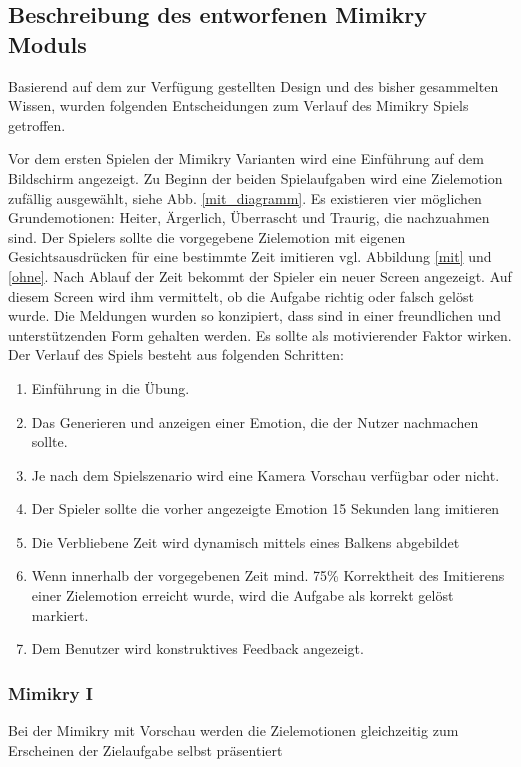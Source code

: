\subsection{Beschreibung des entworfenen Mimikry Moduls}
Basierend auf dem zur Verfügung gestellten Design und des bisher gesammelten Wissen, wurden folgenden Entscheidungen zum Verlauf des Mimikry Spiels getroffen.

Vor dem ersten Spielen der Mimikry Varianten wird eine Einführung auf dem Bildschirm angezeigt. Zu Beginn der beiden Spielaufgaben wird eine Zielemotion zufällig ausgewählt, siehe Abb. \ref{mit_diagramm}. Es existieren vier möglichen Grundemotionen: Heiter, Ärgerlich, Überrascht und Traurig, die nachzuahmen sind. Der Spielers sollte die vorgegebene Zielemotion mit eigenen Gesichtsausdrücken für eine bestimmte Zeit imitieren vgl. Abbildung \ref{mit} und \ref{ohne}. Nach Ablauf der Zeit bekommt der Spieler ein neuer Screen angezeigt. Auf diesem Screen wird ihm vermittelt, ob die Aufgabe richtig oder falsch gelöst wurde. Die Meldungen wurden so konzipiert, dass sind in einer freundlichen und unterstützenden Form gehalten werden. Es sollte als motivierender Faktor wirken.
Der Verlauf des Spiels besteht aus folgenden Schritten:

\begin{enumerate}
    \item Einführung in die Übung.
    \item Das Generieren und anzeigen einer Emotion, die der Nutzer nachmachen sollte.
    \item Je nach dem Spielszenario wird eine Kamera Vorschau verfügbar oder nicht. 
    \item Der Spieler sollte die vorher angezeigte Emotion  15 Sekunden lang imitieren
    \item Die Verbliebene Zeit wird dynamisch mittels eines Balkens abgebildet
    \item Wenn innerhalb der vorgegebenen Zeit mind. 75\% Korrektheit des Imitierens einer Zielemotion erreicht wurde, wird die Aufgabe als korrekt gelöst markiert.
    \item Dem Benutzer wird konstruktives Feedback angezeigt.
\end{enumerate}

\subsubsection{Mimikry I} 
Bei der Mimikry mit Vorschau werden die Zielemotionen gleichzeitig zum Erscheinen der Zielaufgabe selbst präsentiert

